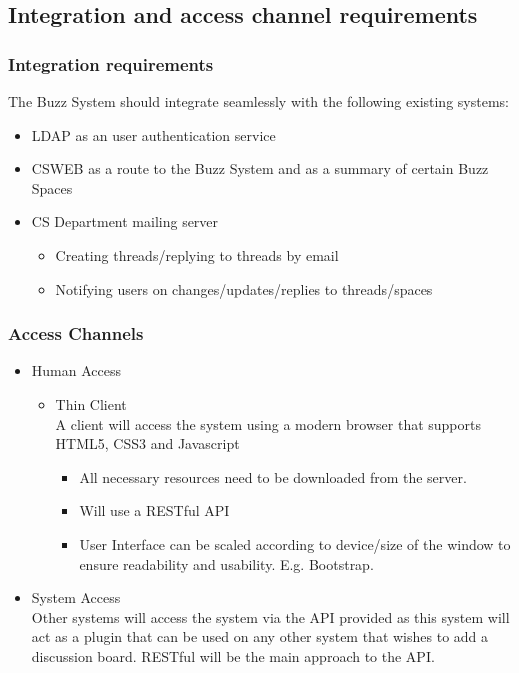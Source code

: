 
\subsection{Integration and access channel requirements}
	\subsubsection{Integration requirements}
		The Buzz System should integrate seamlessly with the following existing systems:		
		\begin{itemize}
			\item LDAP as an user authentication service
			\item CSWEB as a route to the Buzz System and as a summary of certain Buzz Spaces
			\item CS Department mailing server
				\begin{itemize}
					\item Creating threads/replying to threads by email 
					\item Notifying users on changes/updates/replies to threads/spaces
				\end{itemize}
		\end{itemize}
	\subsubsection{Access Channels}
		\begin{itemize}
			\item Human Access
				\begin{itemize}
					\item Thin Client\\
					A client will access the system using a modern browser that supports HTML5, CSS3 and Javascript 
						\begin{itemize}
							\item All necessary resources need to be downloaded from the server.
							\item Will use a RESTful API 
							\item User Interface can be scaled according to device/size of the window to ensure readability and usability. E.g. Bootstrap.
						\end{itemize}
				\end{itemize}
			\item System Access\\
			Other systems will access the system via the API provided as this system will act as a plugin that can be used on any other system that wishes to add a discussion board. RESTful will be the main approach to the API.
		\end{itemize}